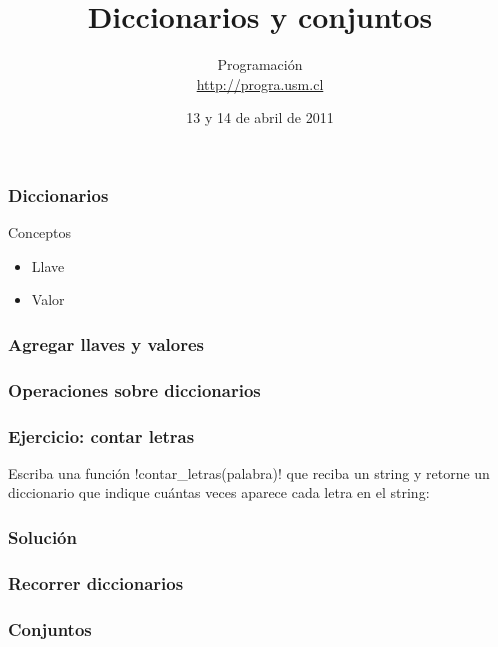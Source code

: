 \documentclass[12pt]{beamer}
\title{Diccionarios y conjuntos}
\author{
  Programación \\ \url{http://progra.usm.cl}
}
\date{13 y 14 de abril de 2011}
\begin{document}
  \begin{frame}
    \maketitle
  \end{frame}

  \begin{frame}
    \frametitle{Diccionarios}
    \label{dicc-telefonos}
    
    \begin{block}{Conceptos}
      \begin{itemize}
        \item Llave
        \item Valor
      \end{itemize}
    \end{block}
  \end{frame}

  \begin{frame}
    \frametitle{Agregar llaves y valores}
    \label{dicc-agregar}
    
  \end{frame}

  \begin{frame}
    \frametitle{Operaciones sobre diccionarios}
    \label{dicc-operaciones}
    \footnotesize
    
  \end{frame}

  \begin{frame}
    \frametitle{Ejercicio: contar letras}
    \label{ejercicio-contar-letras}
    Escriba una función \li!contar_letras(palabra)!
    que reciba un string y retorne un diccionario
    que indique cuántas veces aparece cada letra en el string:
    
  \end{frame}

  \begin{frame}
    \frametitle{Solución}
    \label{solucion-contar-letras}
    
  \end{frame}

  \begin{frame}
    \frametitle{Recorrer diccionarios}
    \label{recorrer-diccionarios}
    \footnotesize
    
  \end{frame}

  \begin{frame}
    \frametitle{Conjuntos}
    \label{conjuntos-crear}
    
  \end{frame}
\end{document}
